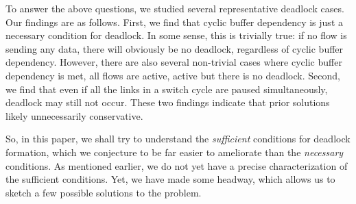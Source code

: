 To answer the above questions, we studied several representative deadlock cases.
Our findings are as follows. First, we find that cyclic buffer dependency is
just a necessary condition for deadlock. In some sense, this is trivially true:
if no flow is sending any data, there will obviously be no deadlock, regardless
of cyclic buffer dependency.  However, there are also several non-trivial cases
where cyclic buffer dependency is met, all flows are active, active but there is
no deadlock.  Second, we find that even if all the links in a switch cycle are
paused simultaneously, deadlock may still not occur.  These two findings
indicate that prior solutions likely unnecessarily conservative. 

So, in this paper, we shall try to understand the {\em sufficient} conditions
for deadlock formation, which we conjecture to be far easier to ameliorate than
the {\em necessary} conditions. As mentioned earlier, we do not yet have a precise
characterization of the sufficient conditions. Yet, we have made some headway,
which allows us to sketch a few possible solutions to the problem.

